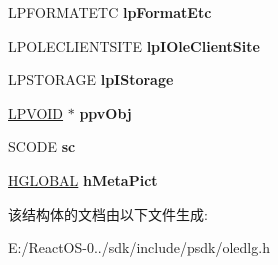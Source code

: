\begin{DoxyCompactItemize}
\item 
\mbox{\label{structtag_o_l_e_u_i_i_n_s_e_r_t_o_b_j_e_c_t_a_a4795ef9b8fc8590c1ca0230494e583f7}} 
L\+P\+F\+O\+R\+M\+A\+T\+E\+TC {\bfseries lp\+Format\+Etc}
\item 
\mbox{\label{structtag_o_l_e_u_i_i_n_s_e_r_t_o_b_j_e_c_t_a_a7bf128ab93b0167d55d0c15f22c1ea94}} 
L\+P\+O\+L\+E\+C\+L\+I\+E\+N\+T\+S\+I\+TE {\bfseries lp\+I\+Ole\+Client\+Site}
\item 
\mbox{\label{structtag_o_l_e_u_i_i_n_s_e_r_t_o_b_j_e_c_t_a_a8146a5cf080da90c89a043d4ac818837}} 
L\+P\+S\+T\+O\+R\+A\+GE {\bfseries lp\+I\+Storage}
\item 
\mbox{\label{structtag_o_l_e_u_i_i_n_s_e_r_t_o_b_j_e_c_t_a_adef3a1179a16d66246fb0e0aa7ef34c7}} 
\hyperlink{interfacevoid}{L\+P\+V\+O\+ID} $\ast$ {\bfseries ppv\+Obj}
\item 
\mbox{\label{structtag_o_l_e_u_i_i_n_s_e_r_t_o_b_j_e_c_t_a_a1fb1cf86101dae7b0c603bb01884f013}} 
S\+C\+O\+DE {\bfseries sc}
\item 
\mbox{\label{structtag_o_l_e_u_i_i_n_s_e_r_t_o_b_j_e_c_t_a_a885bcd85fb874f5ce0cf5e1dca164928}} 
\hyperlink{interfacevoid}{H\+G\+L\+O\+B\+AL} {\bfseries h\+Meta\+Pict}
\end{DoxyCompactItemize}


该结构体的文档由以下文件生成\+:\begin{DoxyCompactItemize}
\item 
E\+:/\+React\+O\+S-\/0../sdk/include/psdk/oledlg.\+h\end{DoxyCompactItemize}
